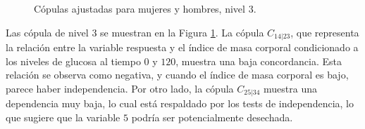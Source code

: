 \begin{figure}[H]
 \centering
    \caption{Cópulas ajustadas para mujeres y hombres, nivel $3$.}
    \label{fig:Modelo4TotalNivel3}
\end{figure}


Las cópula de nivel $3$ se muestran en la Figura \ref{fig:Modelo4TotalNivel3}. La cópula $C_{14|23}$, que representa la relación entre la variable respuesta y el índice de masa corporal condicionado a los niveles de glucosa al tiempo $0$ y $120$, muestra una baja concordancia. Esta relación se observa como negativa, y cuando el índice de masa corporal es bajo, parece haber independencia. Por otro lado, la cópula $C_{25|34}$ muestra una dependencia muy baja, lo cual está respaldado por los tests de independencia, lo que sugiere que la variable $5$ podría ser potencialmente desechada.



